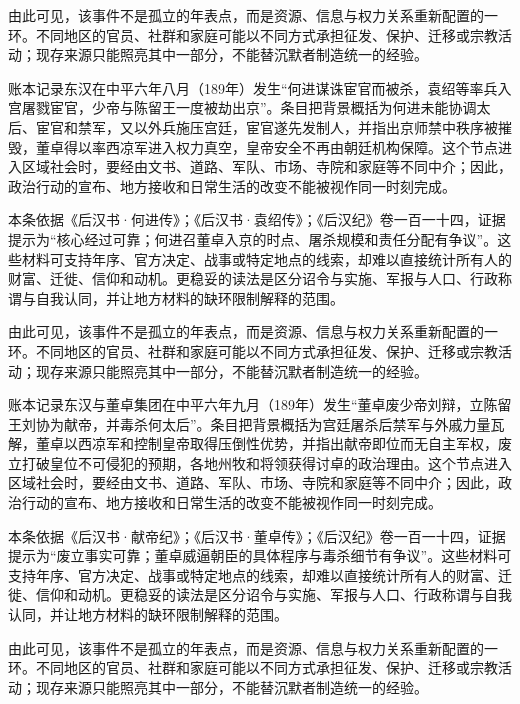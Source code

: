 由此可见，该事件不是孤立的年表点，而是资源、信息与权力关系重新配置的一环。不同地区的官员、社群和家庭可能以不同方式承担征发、保护、迁移或宗教活动；现存来源只能照亮其中一部分，不能替沉默者制造统一的经验。

账本记录东汉在中平六年八月（189年）发生“何进谋诛宦官而被杀，袁绍等率兵入宫屠戮宦官，少帝与陈留王一度被劫出京”。条目把背景概括为何进未能协调太后、宦官和禁军，又以外兵施压宫廷，宦官遂先发制人，并指出京师禁中秩序被摧毁，董卓得以率西凉军进入权力真空，皇帝安全不再由朝廷机构保障。这个节点进入区域社会时，要经由文书、道路、军队、市场、寺院和家庭等不同中介；因此，政治行动的宣布、地方接收和日常生活的改变不能被视作同一时刻完成。

本条依据《后汉书·何进传》；《后汉书·袁绍传》；《后汉纪》卷一百一十四，证据提示为“核心经过可靠；何进召董卓入京的时点、屠杀规模和责任分配有争议”。这些材料可支持年序、官方决定、战事或特定地点的线索，却难以直接统计所有人的财富、迁徙、信仰和动机。更稳妥的读法是区分诏令与实施、军报与人口、行政称谓与自我认同，并让地方材料的缺环限制解释的范围。

由此可见，该事件不是孤立的年表点，而是资源、信息与权力关系重新配置的一环。不同地区的官员、社群和家庭可能以不同方式承担征发、保护、迁移或宗教活动；现存来源只能照亮其中一部分，不能替沉默者制造统一的经验。

账本记录东汉与董卓集团在中平六年九月（189年）发生“董卓废少帝刘辩，立陈留王刘协为献帝，并毒杀何太后”。条目把背景概括为宫廷屠杀后禁军与外戚力量瓦解，董卓以西凉军和控制皇帝取得压倒性优势，并指出献帝即位而无自主军权，废立打破皇位不可侵犯的预期，各地州牧和将领获得讨卓的政治理由。这个节点进入区域社会时，要经由文书、道路、军队、市场、寺院和家庭等不同中介；因此，政治行动的宣布、地方接收和日常生活的改变不能被视作同一时刻完成。

本条依据《后汉书·献帝纪》；《后汉书·董卓传》；《后汉纪》卷一百一十四，证据提示为“废立事实可靠；董卓威逼朝臣的具体程序与毒杀细节有争议”。这些材料可支持年序、官方决定、战事或特定地点的线索，却难以直接统计所有人的财富、迁徙、信仰和动机。更稳妥的读法是区分诏令与实施、军报与人口、行政称谓与自我认同，并让地方材料的缺环限制解释的范围。

由此可见，该事件不是孤立的年表点，而是资源、信息与权力关系重新配置的一环。不同地区的官员、社群和家庭可能以不同方式承担征发、保护、迁移或宗教活动；现存来源只能照亮其中一部分，不能替沉默者制造统一的经验。

